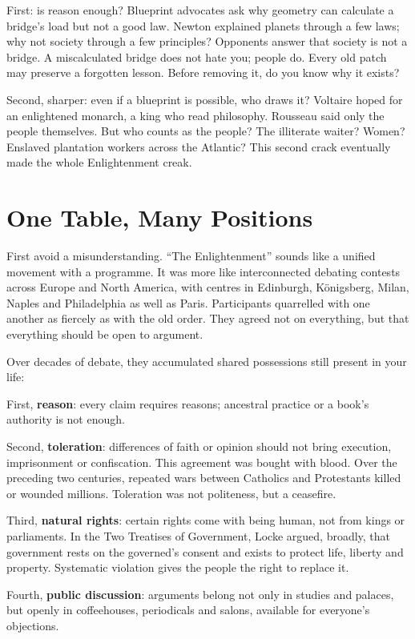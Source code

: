 First: is reason enough? Blueprint advocates ask why geometry can calculate a bridge's load but not a good law. Newton explained planets through a few laws; why not society through a few principles? Opponents answer that society is not a bridge. A miscalculated bridge does not hate you; people do. Every old patch may preserve a forgotten lesson. Before removing it, do you know why it exists?

Second, sharper: even if a blueprint is possible, who draws it? Voltaire hoped for an enlightened monarch, a king who read philosophy. Rousseau said only the people themselves. But who counts as the people? The illiterate waiter? Women? Enslaved plantation workers across the Atlantic? This second crack eventually made the whole Enlightenment creak.

\section{One Table, Many Positions}
First avoid a misunderstanding. ``The Enlightenment'' sounds like a unified movement with a programme. It was more like interconnected debating contests across Europe and North America, with centres in Edinburgh, Königsberg, Milan, Naples and Philadelphia as well as Paris. Participants quarrelled with one another as fiercely as with the old order. They agreed not on everything, but that everything should be open to argument.

Over decades of debate, they accumulated shared possessions still present in your life:

First, \textbf{reason}: every claim requires reasons; ancestral practice or a book's authority is not enough.

Second, \textbf{toleration}: differences of faith or opinion should not bring execution, imprisonment or confiscation. This agreement was bought with blood. Over the preceding two centuries, repeated wars between Catholics and Protestants killed or wounded millions. Toleration was not politeness, but a ceasefire.

Third, \textbf{natural rights}: certain rights come with being human, not from kings or parliaments. In the Two Treatises of Government, Locke argued, broadly, that government rests on the governed's consent and exists to protect life, liberty and property. Systematic violation gives the people the right to replace it.

Fourth, \textbf{public discussion}: arguments belong not only in studies and palaces, but openly in coffeehouses, periodicals and salons, available for everyone's objections.

